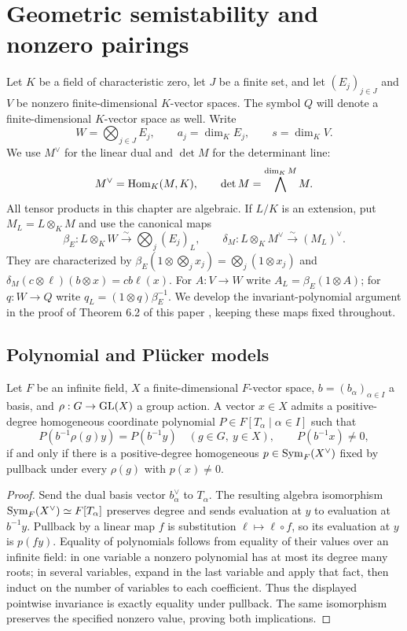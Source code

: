 \chapter{Geometric semistability and nonzero pairings}

Let $K$ be a field of characteristic zero, let $J$ be a finite set, and let
$(E_j)_{j\in J}$ and $V$ be nonzero finite-dimensional $K$-vector spaces.
The symbol $Q$ will denote a finite-dimensional $K$-vector space as well.
Write
\[
 W=\bigotimes_{j\in J}E_j,\qquad a_j=\dim_K E_j,\qquad s=\dim_K V.
\]
We use $M^\vee$ for the linear dual and $\det M$ for the determinant line:
\[
 M^\vee=\operatorname{Hom}_K(M,K),\qquad \det M=\bigwedge^{\dim_K M}M.
\]
All tensor products in this chapter are algebraic. If $L/K$ is an extension,
put $M_L=L\otimes_K M$ and use the canonical maps
\[
 \beta_E:L\otimes_K W\xrightarrow{\sim}\bigotimes_j(E_j)_L,
 \qquad
 \delta_M:L\otimes_K M^\vee\xrightarrow{\sim}(M_L)^\vee.
\]
They are characterized by
$\beta_E(1\otimes\bigotimes_j x_j)=\bigotimes_j(1\otimes x_j)$ and
$\delta_M(c\otimes\ell)(b\otimes x)=cb\ell(x)$.
For $A:V\to W$ write $A_L=\beta_E(1\otimes A)$; for $q:W\to Q$ write
$q_L=(1\otimes q)\beta_E^{-1}$.
We develop the invariant-polynomial argument in the proof of Theorem 6.2 of
this paper \cite{bost2026}, keeping these maps fixed throughout.

\section{Polynomial and Pl\"ucker models}

\begin{lemma}
\label{lem:invariant-polynomial-models}
\leanok
Let $F$ be an infinite field, $X$ a finite-dimensional $F$-vector space,
$b=(b_\alpha)_{\alpha\in I}$ a basis, and $\rho:G\to\operatorname{GL}(X)$ a group action.
A vector $x\in X$ admits a positive-degree homogeneous coordinate polynomial
$P\in F[T_\alpha\mid\alpha\in I]$ such that
\[
 P(b^{-1}\rho(g)y)=P(b^{-1}y)\quad(g\in G,\ y\in X),
 \qquad P(b^{-1}x)\ne0,
\]
if and only if there is a positive-degree homogeneous
$p\in\operatorname{Sym}_F(X^\vee)$ fixed by pullback under every $\rho(g)$ with $p(x)\ne0$.
\end{lemma}
\begin{proof}
Send the dual basis vector $b_\alpha^\vee$ to $T_\alpha$. The resulting
algebra isomorphism $\operatorname{Sym}_F(X^\vee)\simeq F[T_\alpha]$ preserves degree and
sends evaluation at $y$ to evaluation at $b^{-1}y$. Pullback by a linear map
$f$ is substitution $\ell\mapsto\ell\circ f$, so its evaluation at $y$ is
$p(fy)$. Equality of polynomials follows from equality of their values over
an infinite field: in one variable a nonzero polynomial has at most its
degree many roots; in several variables, expand in the last variable and
apply that fact, then induct on the number of variables to each coefficient.
Thus the displayed pointwise invariance is exactly equality under pullback.
The same isomorphism preserves the specified nonzero value, proving both
implications.
\end{proof}

